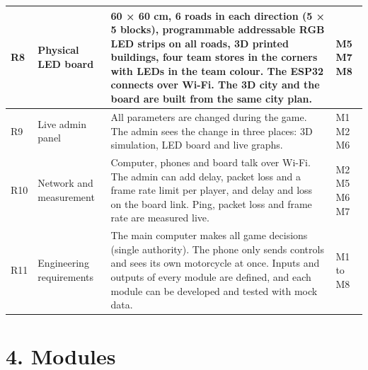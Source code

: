 \documentclass[
  english,
  10pt,
  a4paper,
]{article}
\begin{document}
{\begin{tabular}{|L{0.05}|L{0.16}|L{0.63}|L{0.16}|}
R8 & Physical LED board & 60 × 60 cm, 6 roads in each direction (5 × 5 blocks), programmable addressable RGB LED strips on all roads, 3D printed buildings, four team stores in the corners with LEDs in the team colour. The ESP32 connects over Wi-Fi. The 3D city and the board are built from the same city plan. & M5 M7 M8 \\ \hline
R9 & Live admin panel & All parameters are changed during the game. The admin sees the change in three places: 3D simulation, LED board and live graphs. & M1 M2 M6 \\ \hline
R10 & Network and measurement & Computer, phones and board talk over Wi-Fi. The admin can add delay, packet loss and a frame rate limit per player, and delay and loss on the board link. Ping, packet loss and frame rate are measured live. & M2 M5 M6 M7 \\ \hline
R11 & Engineering requirements & The main computer makes all game decisions (single authority). The phone only sends controls and sees its own motorcycle at once. Inputs and outputs of every module are defined, and each module can be developed and tested with mock data. & M1 to M8 \\ \hline
\end{tabular}}

\section{4. Modules}
\end{document}

